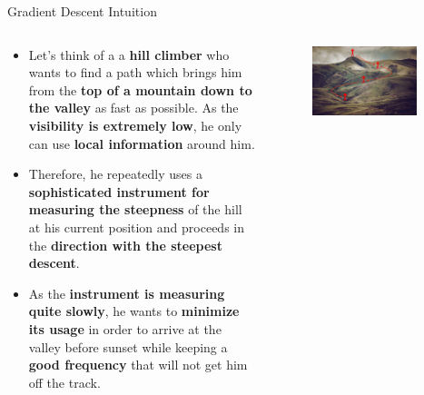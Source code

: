 \documentclass[document.tex]{subfiles}
\begin{document}
    \begin{frame}{Gradient Descent Intuition}
        \begin{columns}
            \begin{column}{0.6\textwidth}
                \begin{itemize}
                    \item Let's think of a a \textbf{hill climber} who wants to find a path which brings him from the \textbf{top of a mountain down to the valley} as fast as possible. As the \textbf{visibility is extremely low}, he only can use \textbf{local information} around him. 
                    \item Therefore, he repeatedly uses a \textbf{sophisticated instrument for measuring the steepness} of the hill at his current position and proceeds in the \textbf{direction with the steepest descent}.
                    \item As the \textbf{instrument is measuring quite slowly}, he wants to \textbf{minimize its usage} in order to arrive at the valley before sunset while keeping a \textbf{good frequency} that will not get him off the track.
                \end{itemize}
            \end{column}
            \begin{column}{0.4\textwidth}
                \begin{figure}
                    \label{fig:hill-climber-analogy}
                    \includegraphics[width=0.9\textwidth, keepaspectratio]{figures/external/hill-climber-analogy.jpg}
                \end{figure}
            \end{column}
        \end{columns}
    \end{frame}
\end{document}
